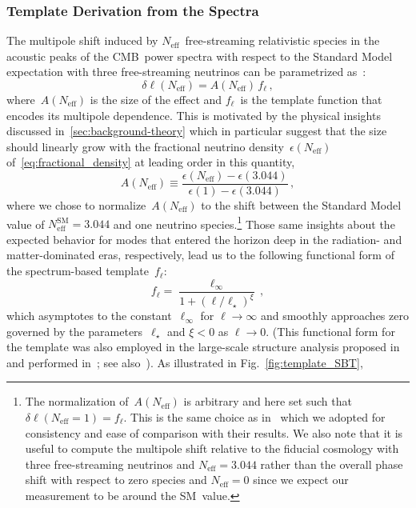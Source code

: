 \documentclass[11pt]{article}
\numberwithin{equation}{section}
\newcommand{\Neff}{N_\mathrm{eff}}
\begin{document}
\subsubsection{Template Derivation from the Spectra}
\label{sec:spectrum-template}

The multipole shift induced by $\Neff$~free-streaming relativistic species in the acoustic peaks of the CMB~power spectra with respect to the Standard Model expectation with three free-streaming neutrinos can be parametrized as~\cite{Follin:2015hya}:
\begin{equation}
	\delta\ell(\Neff) = A(\Neff)\,f_\ell \, ,	\label{eq:delta_ell_def1}
\end{equation}
where~$A(\Neff)$ is the size of the effect and $f_\ell$~is the template function that encodes its multipole dependence. This is motivated by the physical insights discussed in~\textsection\ref{sec:background-theory} which in particular suggest that the size should linearly grow with the fractional neutrino density~$\epsilon(\Neff)$ of~\eqref{eq:fractional_density} at leading order in this quantity,
\begin{equation}
	A(\Neff) \equiv \frac{\epsilon(\Neff)-\epsilon(3.044)}{\epsilon(1)-\epsilon(3.044)}\, ,	\label{eq:ANeff}
\end{equation}
where we chose to normalize~$A(\Neff)$ to the shift between the Standard Model value of $\Neff^\mathrm{SM} = 3.044$ and one neutrino species.\footnote{The normalization of~$A(\Neff)$ is arbitrary and here set such that $\delta\ell(\Neff = 1) = f_\ell$. This is the same choice as in~\cite{Follin:2015hya} which we adopted for consistency and ease of comparison with their results. We also note that it is useful to compute the multipole shift relative to the fiducial cosmology with three free-streaming neutrinos and $\Neff = 3.044$ rather than the overall phase shift with respect to zero species and $\Neff = 0$ since we expect our measurement to be around the SM~value.} Those same insights about the expected behavior for modes that entered the horizon deep in the radiation- and matter-dominated eras, respectively, lead us to the following functional form of the spectrum-based template~$f_\ell$:
\begin{equation}
	f_\ell = \frac{\ell_\infty}{1 + (\ell/\ell_\star)^\xi}\, ,	\label{eq:f_ell_def}
\end{equation}
which asymptotes to the constant~$\ell_\infty$ for $\ell \to \infty$ and smoothly approaches zero governed by the parameters~$\ell_\star$ and $\xi < 0$ as $\ell \to 0$. (This functional form for the template was also employed in the large-scale structure analysis proposed in~\cite{Baumann:2017gkg} and performed in~\cite{Baumann:2019keh, Whitford:2024ecj}; see also~\cite{Green:2020fjb}). As illustrated in Fig.~\ref{fig:template_SBT},%
\end{document}
